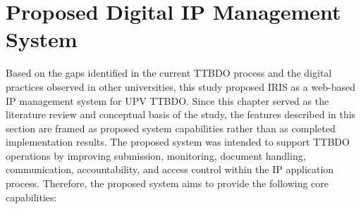 \section{Proposed Digital IP Management System}

Based on the gaps identified in the current TTBDO process and the digital practices observed in other universities, this study proposed IRIS as a web-based IP management system for UPV TTBDO. 
Since this chapter served as the literature review and conceptual basis of the study, the features described in this section are framed as proposed system capabilities rather than as completed implementation results. 
The proposed system was intended to support TTBDO operations by improving submission, monitoring, document handling, communication, accountability, and access control within the IP application process. 
Therefore, the proposed system aims to provide the following core capabilities:

